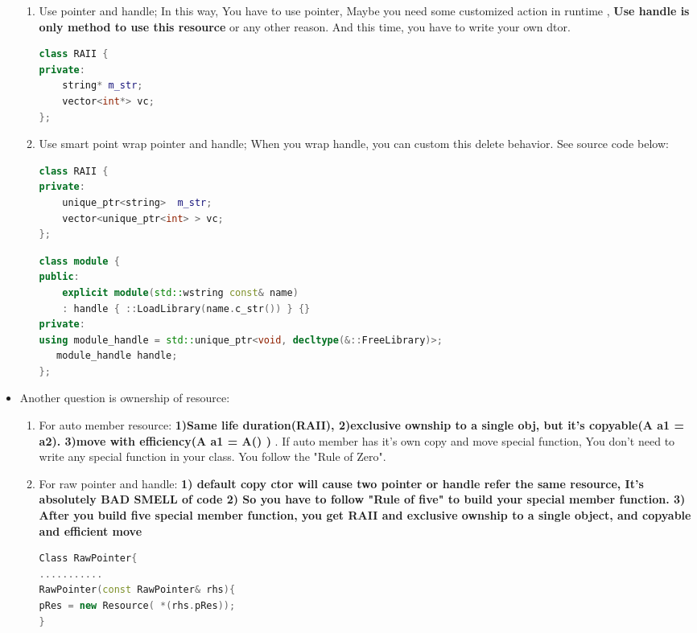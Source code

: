 \documentclass[a4paper,12pt,twoside]{book}
\begin{document}
\begin{itemize}
\begin{enumerate}
\item Use pointer and handle; In this way, You have to use pointer, Maybe you need some customized action in runtime , \textbf{Use handle is only method to use this resource} or any other reason. And this time, you have to write your own dtor.
\begin{lstlisting}[frame=single, language=c++]
class RAII {
private:
    string* m_str;
    vector<int*> vc;
};
\end{lstlisting}

\item Use smart point wrap pointer and handle; When you wrap handle, you can custom this delete behavior. See source code below:
\begin{lstlisting}[frame=single, language=c++]
class RAII {
private:
    unique_ptr<string>  m_str;
    vector<unique_ptr<int> > vc;
};
\end{lstlisting}

\begin{lstlisting}[frame=single, language=c++]
class module {
public:
    explicit module(std::wstring const& name)
    : handle { ::LoadLibrary(name.c_str()) } {}
private:
using module_handle = std::unique_ptr<void, decltype(&::FreeLibrary)>;
   module_handle handle;
};
\end{lstlisting}
\end{enumerate}

\item Another question is ownership of resource:
\begin{enumerate}
\item For auto member resource: \textbf{1)Same life duration(RAII), 2)exclusive ownship to a single obj, but it's copyable(A a1 = a2).  3)move with efficiency(A a1 = A() ) }. If auto member has it's own copy and move special function, You don't need to write any special function in your class. You follow the "Rule of Zero".

\item For raw pointer and handle: \textbf{1) default copy ctor will cause two pointer or handle refer the same resource, It's absolutely BAD SMELL of code 2) So you have to follow "Rule of five" to build your special member function. 3) After you build five special member function, you get RAII and exclusive ownship to a single object, and copyable and efficient move}
\begin{lstlisting}[frame=single, language=c++]
Class RawPointer{
...........
RawPointer(const RawPointer& rhs){
pRes = new Resource( *(rhs.pRes));
}


\end{lstlisting}
\end{enumerate}
\end{itemize}
\end{document}
